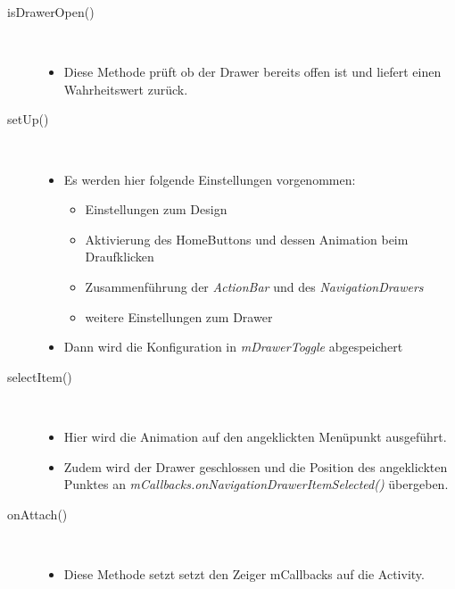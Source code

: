 \begin{description}
\item[isDrawerOpen()]~\par
\begin{itemize}
\item Diese Methode prüft ob der Drawer bereits offen ist und liefert einen Wahrheitswert zurück.
\end{itemize} 
\item[setUp()]~\par
\begin{itemize}
\item Es werden hier folgende Einstellungen vorgenommen:
\begin{itemize}
\item Einstellungen zum Design
\item Aktivierung des HomeButtons und dessen Animation beim Draufklicken
\item Zusammenführung der \textit{ActionBar} und des \textit{NavigationDrawers}
\item weitere Einstellungen zum Drawer
\end{itemize}
\item Dann wird die Konfiguration in \textit{mDrawerToggle} abgespeichert
\end{itemize}

\item[selectItem()]~\par
\begin{itemize}
\item Hier wird die Animation auf den angeklickten Menüpunkt ausgeführt.
\item Zudem wird der Drawer geschlossen und die Position des angeklickten Punktes an \textit{mCallbacks.onNavigationDrawerItemSelected()}  übergeben.
\end{itemize} 
\item[onAttach()]~\par
\begin{itemize}
\item Diese Methode setzt setzt den Zeiger mCallbacks auf die Activity.
\end{itemize}
 

\end{description}
